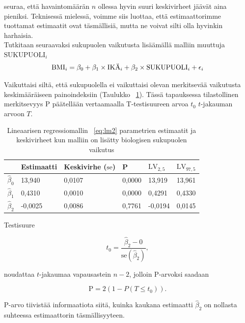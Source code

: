 \documentclass[finnish]{docopts}
\begin{document}
seuraa, että havaintomäärän $n$ ollessa hyvin suuri keskivirheet jäävät aina pieniksi. Teknisessä mielessä, voimme siis luottaa, että estimaattorimme tuottamat estimaatit ovat täsmällisiä, mutta ne voivat silti olla hyvinkin harhaisia.\\

Tutkitaan seuraavaksi sukupuolen vaikutusta lisäämällä malliin muuttuja $\text{SUKUPUOLI}_i$\\

\begin{equation}
\text{BMI}_i = \beta_0 + \beta_1 \times \text{IKÄ}_i + \beta_2 \times \text{SUKUPUOLI}_i + \epsilon_i \label{eq:lm2}\\
\end{equation}

Vaikuttaisi siltä, että sukupuolella ei vaikuttaisi olevan merkitsevää vaikutusta keskimääräiseen painoindeksiin (Taulukko ~\ref{table:lm2}). Tässä tapauksessa tilastollinen merkitsevyys $\text{P}$ päätellään vertaamaalla T-testisuureen arvoa $t_0$ $t$-jakauman arvoon $T$.\\

\begin{table}[H]
\centering
\begin{tabular}{llllll}
\toprule
  & Estimaatti & Keskivirhe ($\text{se}$) & P & $\text{LV}_{2,5}$ & $\text{LV}_{97,5}$\\
\midrule
$\hat{\beta}_0$ & 13,940 & 0,0107 & 0,0000 & 13,919 & 13,961\\
$\hat{\beta}_1$ & 0,4310 & 0,0010 & 0,0000 & 0,4291 & 0,4330\\
$\hat{\beta}_2$ & -0,0025 & 0,0086 & 0,7761 & -0,0194 & 0,0145\\
\bottomrule
\end{tabular}
\caption{Lineaarisen regressiomallin ~\ref{eq:lm2} parametrien estimaatit ja keskivirheet kun malliin on lisätty biologisen sukupuolen vaikutus}
\label{table:lm2}
\end{table}

Testisuure

$$
t_0 = \frac{\hat{\beta}_2 - 0}{\text{se}(\hat{\beta}_2)},
$$

noudattaa $t$-jakaumaa vapausastein $n-2$, jolloin P-arvoksi saadaan

$$
\text{P} = 2(1-P(T \leq t_0)).
$$

P-arvo tiivistää informaatiota siitä, kuinka kaukana estimaatti $\hat{\beta}_2$ on nollasta suhteessa estimaattorin täsmällisyyteen.\\
\end{document}
